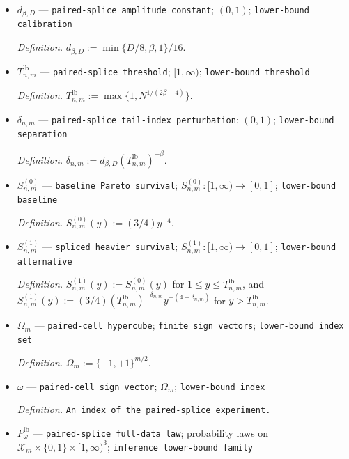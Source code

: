 \documentclass{article}
\begin{document}
\begin{itemize}
  \par\smallskip\noindent\emph{Definition.} \(N:=n/m\).
  \item \(d_{\beta,D}\) --- \texttt{paired-\allowbreak{}splice amplitude constant}; \((0,1)\); \texttt{lower-\allowbreak{}bound calibration}
  \par\smallskip\noindent\emph{Definition.} \(d_{\beta,D}:=\min\{D/8,\beta,1\}/16\).
  \item \(T^{\mathrm{lb}}_{n,m}\) --- \texttt{paired-\allowbreak{}splice threshold}; \([1,\infty)\); \texttt{lower-\allowbreak{}bound threshold}
  \par\smallskip\noindent\emph{Definition.} \(T^{\mathrm{lb}}_{n,m}:=\max\{1,N^{1/(2\beta+4)}\}\).
  \item \(\delta_{n,m}\) --- \texttt{paired-\allowbreak{}splice tail-\allowbreak{}index perturbation}; \((0,1)\); \texttt{lower-\allowbreak{}bound separation}
  \par\smallskip\noindent\emph{Definition.} \(\delta_{n,m}:=d_{\beta,D}(T^{\mathrm{lb}}_{n,m})^{-\beta}\).
  \item \(S^{(0)}_{n,m}\) --- \texttt{baseline Pareto survival}; \(S^{(0)}_{n,m}:[1,\infty)\to[0,1]\); \texttt{lower-\allowbreak{}bound baseline}
  \par\smallskip\noindent\emph{Definition.} \(S^{(0)}_{n,m}(y):=(3/4)y^{-4}\).
  \item \(S^{(1)}_{n,m}\) --- \texttt{spliced heavier survival}; \(S^{(1)}_{n,m}:[1,\infty)\to[0,1]\); \texttt{lower-\allowbreak{}bound alternative}
  \par\smallskip\noindent\emph{Definition.} \(S^{(1)}_{n,m}(y):=S^{(0)}_{n,m}(y)\) for \(1\le y\le T^{\mathrm{lb}}_{n,m}\), and \(S^{(1)}_{n,m}(y):=(3/4)(T^{\mathrm{lb}}_{n,m})^{-\delta_{n,m}}y^{-(4-\delta_{n,m})}\) for \(y>T^{\mathrm{lb}}_{n,m}\).
  \item \(\Omega_m\) --- \texttt{paired-\allowbreak{}cell hypercube}; \texttt{finite sign vectors}; \texttt{lower-\allowbreak{}bound index set}
  \par\smallskip\noindent\emph{Definition.} \(\Omega_m:=\{-1,+1\}^{m/2}\).
  \item \(\omega\) --- \texttt{paired-\allowbreak{}cell sign vector}; \(\Omega_m\); \texttt{lower-\allowbreak{}bound index}
  \par\smallskip\noindent\emph{Definition.} \texttt{An index of the paired-\allowbreak{}splice experiment.}
  \item \(P^{\mathrm{lb}}_{\omega}\) --- \texttt{paired-\allowbreak{}splice full-\allowbreak{}data law}; probability laws on \(\mathcal X_m\times\{0,1\}\times[1,\infty)^3\); \texttt{inference lower-\allowbreak{}bound family}

\end{itemize}
\end{document}

